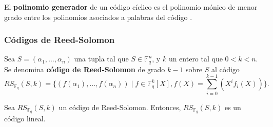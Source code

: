 \begin{definition}
	El \textbf{polinomio generador} de un código cíclico es el polinomio mónico de menor grado entre los polinomios asociados a palabras del código \autocite{VERLINDE2003203}.
\end{definition}

\subsubsection{Códigos de Reed-Solomon}

\begin{definition}
	Sea $S = (\alpha_1, \dots, \alpha_n)$ una tupla tal que $S \in \mathbb{F}_q^n$, y $k$ un entero tal que $0 < k < n$. Se denomina \textbf{código de Reed-Solomon} de grado $k-1$ sobre $S$ al código
	\[RS_{\mathbb{F}_q}(S, k) = \big\{(f(\alpha_1), \dots, f(\alpha_n)) \mid f \in \mathbb{F}_q^k[X], f(X) = \sum_{i=0}^{k-1}(X^i f_i(X)) \big\}.\]
\end{definition}

\begin{theorem}
	Sea $RS_{\mathbb{F}_q}(S, k)$ un código de Reed-Solomon. Entonces, $RS_{\mathbb{F}_q}(S, k)$ es un código lineal.
\end{theorem}

